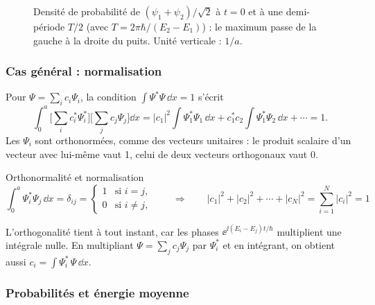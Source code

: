 \begin{figure}[!ht]
\centering
{}
\caption{Densité de probabilité de $(\psi_1+\psi_2)/\sqrt2$ à $t=0$ et à une
demi-période $T/2$ (avec $T=2\pi\hbar/(E_2-E_1)$) : le maximum passe de la gauche à
la droite du puits. Unité verticale : $1/a$.}
\end{figure}

\subsubsection{Cas général : normalisation}

Pour $\Psi=\sum_i c_i\Psi_i$, la condition $\int\Psi^*\Psi\,\dd x=1$ s'écrit
\[
  \int_0^a\Big[\sum_i c_i^*\Psi_i^*\Big]\Big[\sum_j c_j\Psi_j\Big]\dd x
  =|c_1|^2\!\int\!\Psi_1^*\Psi_1\,\dd x+c_1^*c_2\!\int\!\Psi_1^*\Psi_2\,\dd x+\cdots=1 .
\]
Les $\Psi_i$ sont orthonormées, comme des vecteurs unitaires : le produit scalaire d'un
vecteur avec lui-même vaut 1, celui de deux vecteurs orthogonaux vaut 0.

\begin{resultat}{Orthonormalité et normalisation}
\[
  \int_0^a\Psi_i^*\Psi_j\,\dd x=\delta_{ij}=
  \begin{cases}1 & \text{si } i=j,\\ 0 & \text{si } i\neq j,\end{cases}
  \qquad\Longrightarrow\qquad
  |c_1|^2+|c_2|^2+\cdots+|c_N|^2=\sum_{i=1}^{N}|c_i|^2=1
\]
\end{resultat}

L'orthogonalité tient à tout instant, car les phases $\ee^{\ii(E_i-E_j)t/\hbar}$
multiplient une intégrale nulle. En multipliant $\Psi=\sum_j c_j\Psi_j$ par $\Psi_i^*$
et en intégrant, on obtient aussi $c_i=\int\Psi_i^*\,\Psi\,\dd x$.

\subsubsection{Probabilités et énergie moyenne}

